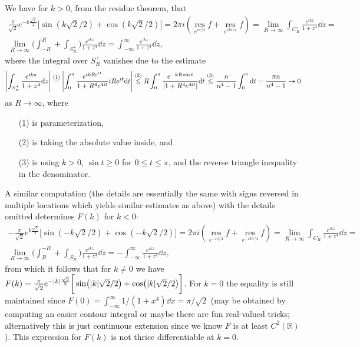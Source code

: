 \documentclass[11pt]{article}
\newcommand{\res}[1]{\operatorname*{res}_{#1}}
\begin{document}
\begin{enumerate}
\begin{enumerate}
        We have for $k>0$, from the residue theorem, that \begin{multline*}
            \frac{\pi}{\sqrt{2} }e^{-k\frac{\sqrt{2}}{2}}\bigg[\sin(k\sqrt{2}/2) + \cos(k\sqrt{2}/2)\bigg]= 2\pi i (\res{e^{i\pi/4}} f + \res{e^{i3\pi/4}} f)= \lim_{R\to\infty} \int_{C_R^+}\frac{e^{ikz}}{1+z^4}\dd z = \\ \lim_{R\to\infty} \bigg(\int_{-R}^R +\int_{S_R^+}\bigg)\frac{e^{ikz}}{1+z^4}\dd z= \int_{-\infty}^\infty \frac{e^{ikz}}{1+z^4}\dd z,
        \end{multline*} where the integral over $S_R^+$ vanishes due to the estimate \[\abs{\int_{S_R^+}\frac{e^{ikz}}{1+z^4}\dd z}\overset{(1)}{=} \abs{\int_{0}^\pi\frac{e^{ikRe^{it}}}{1+R^4e^{4it}}iRe^{it}\dd t}\overset{(2)}{\leq} R\int_{0}^\pi\frac{e^{-kR\sin t}}{\abs{{1+R^4e^{4it}}}}\dd t\overset{(3)}{\leq} \frac{n}{n^4-1}\int_0^\pi \dd t= \frac{\pi n}{n^4-1}\to 0\] as $R\to \infty$, where \begin{enumerate}
            \item[(1)] is parameterization,
            \item[(2)] is taking the absolute value inside, and
            \item[(3)] is using $k>0$, $\sin t\geq 0$ for $0\leq t\leq \pi$, and the reverse triangle inequality in the denominator.
        \end{enumerate} 

        A similar computation (the details are essentially the same with signs reversed in multiple locations which yields similar estimates as above) with the details omitted determines $F(k)$ for $k<0$:
        \begin{multline*}
            -\frac{\pi}{\sqrt{2} }e^{k\frac{\sqrt{2}}{2}}\bigg[\sin(-k\sqrt{2}/2) + \cos(-k\sqrt{2}/2)\bigg]= 2\pi i (\res{e^{-i\pi/4}} f + \res{e^{-i3\pi/4}} f)= \lim_{R\to\infty} \int_{C_R^-}\frac{e^{ikz}}{1+z^4}\dd z = \\ \lim_{R\to\infty} \bigg(\int_{R}^{-R} +\int_{S_R^-}\bigg)\frac{e^{ikz}}{1+z^4}\dd z= -\int_{-\infty}^\infty \frac{e^{ikz}}{1+z^4}\dd z,
        \end{multline*} from which it follows that for $k\neq 0$ we have $F(k) = \frac{\pi}{\sqrt{2} }e^{-\abs{k}\frac{\sqrt{2}}{2}}\bigg[\sin(\abs{k}\sqrt{2}/2) + \cos(\abs{k}\sqrt{2}/2)\bigg]$. For $k = 0$ the equality is still maintained since $F(0) = \int_{-\infty}^\infty 1/(1+x^4)\dd x = \pi/\sqrt{2}$ (may be obtained by computing an easier contour integral or maybe there are fun real-valued tricks; alternatively this is just continuous extension since we know $F$ is at least $C^2(\mathbb{R})$). This expression for $F(k)$ is not thrice differentiable at $k=0$.


\end{enumerate}
\end{enumerate}
\end{document}
